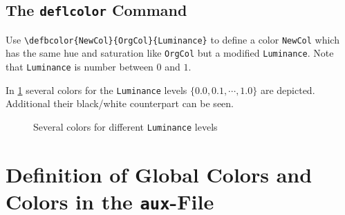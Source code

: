 \documentclass[11pt,DIV=12]{scrartcl}
\begin{document}
%
%
\subsection[The deflcolor Command]{The \lstinline!deflcolor! Command}
Use \lstinline!\defbcolor{NewCol}{OrgCol}{Luminance}! to define a color \lstinline!NewCol! which has the same hue and saturation like \lstinline!OrgCol! but a modified \lstinline!Luminance!. Note that \lstinline!Luminance! is number between $0$ and $1$.

In \cref{fig:luminance} several colors for the \lstinline!Luminance! levels $\{0.0, 0.1, \cdots, 1.0\}$ are depicted. Additional their black/white counterpart can be seen.
\begin{figure}[h]
	\centering
	\caption{Several colors for different \lstinline!Luminance! levels}
	\label{fig:luminance}
\end{figure}



%
\clearpage
\section{Definition of Global Colors and Colors in the \texttt{aux}-File}

%
%
\end{document}
